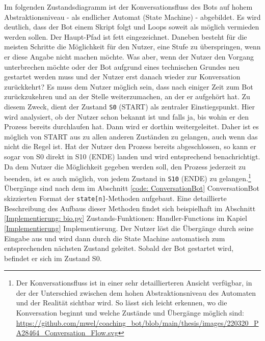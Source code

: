 	Im folgenden Zustandsdiagramm ist der Konversationsfluss des Bots auf hohem Abstraktionsniveau - als endlicher Automat (State Machine) - abgebildet. Es wird deutlich, dass der Bot einem Skript folgt und Loops soweit als möglich vermieden werden sollen. Der Haupt-Pfad ist fett eingezeichnet. Daneben besteht für die meisten Schritte die Möglichkeit für den Nutzer, eine Stufe zu überspringen, wenn er diese Angabe nicht machen möchte. Was aber, wenn der Nutzer den Vorgang unterbrechen möchte oder der Bot aufgrund eines technischen Grundes neu gestartet werden muss und der Nutzer erst danach wieder zur Konversation zurückkehrt? Es muss dem Nutzer möglich sein, dass nach einiger Zeit zum Bot zurückzukehren und an der Stelle weiterzumachen, an der er aufgehört hat. Zu diesem Zweck, dient der Zustand \verb|S0| (START) als zentraler Einstiegspunkt. Hier wird analysiert, ob der Nutzer schon bekannt ist und falls ja, bis wohin er den Prozess bereits durchlaufen hat. Dann wird er dorthin weitergeleitet. Daher ist es möglich von START aus zu allen anderen Zuständen zu gelangen, auch wenn das nicht die Regel ist. Hat der Nutzer den Prozess bereits abgeschlossen, so kann er sogar von S0 direkt in S10 (ENDE) landen und wird entsprechend benachrichtigt. Da dem Nutzer die Möglichkeit gegeben werden soll, den Prozess jederzeit zu beenden, ist es auch möglich, von jedem Zustand in \verb|S10| (ENDE) zu gelangen.\footnote{Der Konversationsfluss ist in einer sehr detaillierteren Ansicht verfügbar, in der der Unterschied zwischen dem hohen Abstraktionsniveau des Automaten und der Realität sichtbar wird. So lässt sich leicht erkennen, wo die Konversation beginnt und welche Zustände und Übergänge möglich sind: \url{https://github.com/mwel/coaching_bot/blob/main/thesis/images/220320_PA28464_Conversation_Flow.svg}} Übergänge sind nach dem im Abschnitt \ref{code: ConversationBot} ConversationBot skizzierten Format der \verb|state[n]|-Methoden aufgebaut. Eine detaillierte Beschreibung des Aufbaus dieser Methoden findet sich beispielhaft im Abschnitt \ref*{Implementierung: bio.py} Zustands-Funktionen: Handler-Functions im Kapiel \ref*{Implementierung} Implementierung. Der Nutzer löst die Übergänge durch seine Eingabe aus und wird dann durch die State Machine automatisch zum entsprechenden nächsten Zustand geleitet.
	Sobald der Bot gestartet wird, befindet er sich im Zustand S0.
